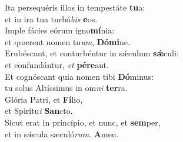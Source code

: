 \evenverse Ita persequéris illos in tempestáte \textbf{tu}a:~\*\\
\evenverse et in ira tua turbá\textit{bis} \textbf{e}os.\\
\oddverse Imple fácies eórum igno\textbf{mí}nia:~\*\\
\oddverse et quærent nomen tu\textit{um}, \textbf{Dó}\textbf{mi}ne.\\
\evenverse Erubéscant, et conturbéntur in sǽculum \textbf{sǽ}culi:~\*\\
\evenverse et confundántur, \textit{et} \textbf{pé}\textbf{re}ant.\\
\oddverse Et cognóscant quia nomen tibi \textbf{Dó}minus:~\*\\
\oddverse tu solus Altíssimus in om\textit{ni} \textbf{ter}ra.\\
\evenverse Glória Patri, et \textbf{Fí}lio,~\*\\
\evenverse et Spirítu\textit{i} \textbf{San}cto.\\
\oddverse Sicut erat in princípio, et nunc, et \textbf{sem}per,~\*\\
\oddverse et in sǽcula sæculó\textit{rum}. \textbf{A}men.\\
